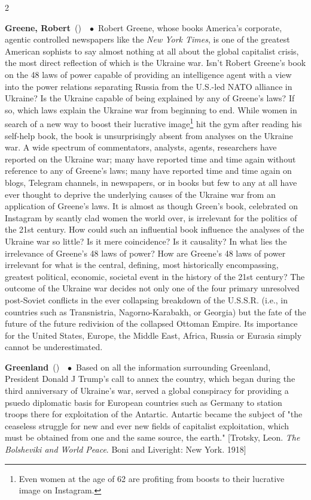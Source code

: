 \documentclass[10pt,a4paper,twoside]{article} %
\newcommand{\entry}[4]{\markboth{#1}{#1}\textbf{#1}\ {(#2)}\ \textit{#3}\ $\bullet$\ {#4}}  %
\begin{document}
\begin{multicols}{2}
\entry{Greene, Robert} {} {} {Robert Greene, whose books America's corporate, agentic controlled newspapers like the \emph{New York Times}, is one of the greatest American sophists to say almost nothing at all about the global capitalist crisis, the most direct reflection of which is the Ukraine war. Isn't Robert Greene's book on the 48 laws of power capable of providing an intelligence agent with a view into the power relations separating Russia from the U.S.-led NATO alliance in Ukraine? Is the Ukraine capable of being explained by any of Greene's laws? If so, which laws explain the Ukraine war from beginning to end. While women in search of a new way to boost their lucrative image\footnote{Even women at the age of 62 are profiting from boosts to their lucrative image on Instagram.} hit the gym after reading his self-help book, the book is unsurprisingly absent from analyses on the Ukraine war. A wide spectrum of commentators, analysts, agents, researchers have reported on the Ukraine war; many have reported time and time again without reference to any of Greene's laws; many have reported time and time again on blogs, Telegram channels, in newspapers, or in books but few to any at all have ever thought to deprive the underlying causes of the Ukraine war from an application of Greene's laws. It is almost as though Green's book, celebrated on Instagram by scantly clad women the world over, is irrelevant for the politics of the 21st century. How could such an influential book influence the analyses of the Ukraine war so little? Is it mere coincidence? Is it causality? In what lies the irrelevance of Greene's 48 laws of power? How are Greene's 48 laws of power irrelevant for what is the central, defining, most historically encompassing, greatest political, economic, societal event in the history of the 21st century? The outcome of the Ukraine war decides not only one of the four primary unresolved post-Soviet conflicts in the ever collapsing breakdown of the U.S.S.R. (i.e., in countries such as Transnistria, Nagorno-Karabakh, or Georgia) but the fate of the future of the future redivision of the collapsed Ottoman Empire. Its importance for the United States, Europe, the Middle East, Africa, Russia or Eurasia simply cannot be underestimated. 
}

\entry{Greenland} {} {} {Based on all the information surrounding Greenland, President Donald J Trump's call to annex the country, which began during the third anniversary of Ukraine's war, served a global conspiracy for providing a psuedo diplomatic basis for European countries such as Germany to station troops there for exploitation of the Antartic. Antartic became the subject of "the ceaseless struggle for new and ever new fields of capitalist exploitation, which must be obtained from one and the same source, the earth." [Trotsky, Leon. \emph{The Bolsheviki and World Peace}. Boni and Liveright: New York. 1918]
}

\end{multicols}
\end{document}
